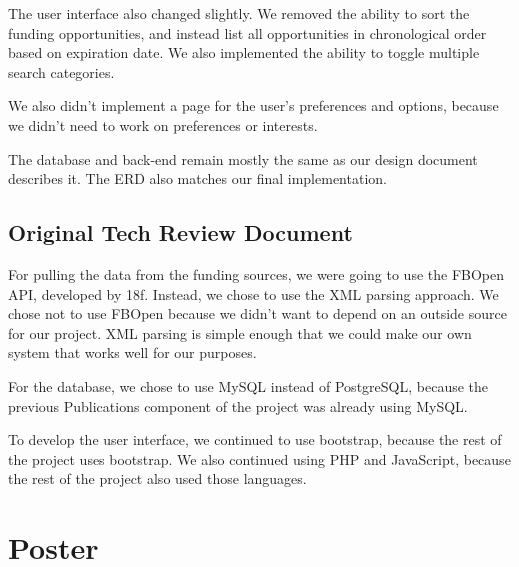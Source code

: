 \documentclass[onecolumn]{IEEEtran}
\begin{document}
The user interface also changed slightly. We removed the ability to sort the funding opportunities, and instead list all opportunities in chronological order based on expiration date. We also implemented the ability to toggle multiple search categories. 

We also didn't implement a page for the user's preferences and options, because we didn't need to work on preferences or interests. 

The database and back-end remain mostly the same as our design document describes it. The ERD also matches our final implementation.

\clearpage
\addtocounter{page}{9}

\subsection{Original Tech Review Document}

For pulling the data from the funding sources, we were going to use the FBOpen API, developed by 18f. Instead, we chose to use the XML parsing approach. We chose not to use FBOpen because we didn't want to depend on an outside source for our project. XML parsing is simple enough that we could make our own system that works well for our purposes. 

For the database, we chose to use MySQL instead of PostgreSQL, because the previous Publications component of the project was already using MySQL. 

To develop the user interface, we continued to use bootstrap, because the rest of the project uses bootstrap.  We also continued using PHP and JavaScript, because the rest of the project also used those languages. 

\clearpage
\addtocounter{page}{10}

\section{Poster}
\clearpage
\addtocounter{page}{1}
\end{document}
